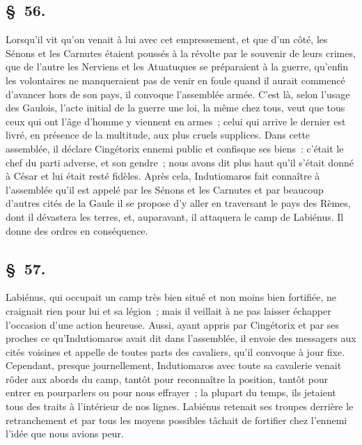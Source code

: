 \documentclass[french,twoside]{book} %
\begin{document}
\subsection[{§ 56.}]{ \textsc{§ 56.} }
\noindent Lorsqu’il vit qu’on venait à lui avec cet empressement, et que d’un côté, les Sénons et les Carnutes étaient poussés à la révolte par le souvenir de leurs crimes, que de l’autre les Nerviens et les Atuatuques se préparaient à la guerre, qu’enfin les volontaires ne manqueraient pas de venir en foule quand il aurait commencé d’avancer hors de son pays, il convoque l’assemblée armée. C'est là, selon l’usage des Gaulois, l’acte initial de la guerre une loi, la même chez tous, veut que tous ceux qui ont l’âge d’homme y viennent en armes ; celui qui arrive le dernier est livré, en présence de la multitude, aux plus cruels supplices. Dans cette assemblée, il déclare Cingétorix ennemi public et confisque ses biens : c’était le chef du parti adverse, et son gendre ; nous avons dit plus haut qu’il s’était donné à César et lui était resté fidèles. Après cela, Indutiomaros fait connaître à l’assemblée qu’il est appelé par les Sénons et les Carnutes et par beaucoup d’autres cités de la Gaule il se propose d’y aller en traversant le pays des Rèmes, dont il dévastera les terres, et, auparavant, il attaquera le camp de Labiénus. Il donne des ordres en conséquence.
\subsection[{§ 57.}]{ \textsc{§ 57.} }
\noindent Labiénus, qui occupait un camp très bien situé et non moins bien fortifiée, ne craignait rien pour lui et sa légion ; mais il veillait à ne pas laisser échapper l’occasion d’une action heureuse. Aussi, ayant appris par Cingétorix et par ses proches ce qu’Indutiomaros avait dit dans l’assemblée, il envoie des messagers aux cités voisines et appelle de toutes parts des cavaliers, qu’il convoque à jour fixe. Cependant, presque journellement, Indutiomaros avec toute sa cavalerie venait rôder aux abords du camp, tantôt pour reconnaître la position, tantôt pour entrer en pourparlers ou pour nous effrayer ; la plupart du temps, ils jetaient tous des traits à l’intérieur de nos lignes. Labiénus retenait ses troupes derrière le retranchement et par tous les moyens possibles tâchait de fortifier chez l’ennemi l’idée que nous avions peur.
\end{document}
